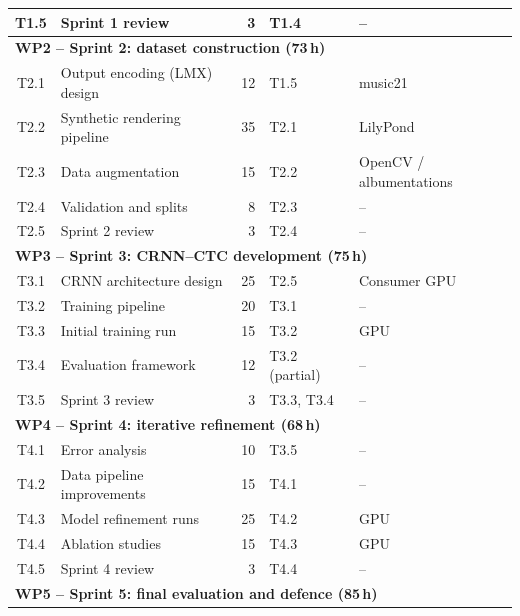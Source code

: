 \begin{table}[H]
\begin{tabularx}{\linewidth}{c >{\raggedright}p{4.2cm} r >{\raggedright\arraybackslash}p{2.2cm} >{\raggedright\arraybackslash}p{2.0cm}}
        T1.5 & Sprint 1 review                      & 3   & T1.4           & -- \\
        \midrule
        \multicolumn{5}{l}{\textbf{WP2 -- Sprint 2: dataset construction (73\,h)}} \\
        \midrule
        T2.1 & Output encoding (LMX) design         & 12  & T1.5           & music21 \\
        T2.2 & Synthetic rendering pipeline         & 35  & T2.1           & LilyPond \\
        T2.3 & Data augmentation                    & 15  & T2.2           & OpenCV / albumentations \\
        T2.4 & Validation and splits                & 8   & T2.3           & -- \\
        T2.5 & Sprint 2 review                      & 3   & T2.4           & -- \\
        \midrule
        \multicolumn{5}{l}{\textbf{WP3 -- Sprint 3: CRNN--CTC development (75\,h)}} \\
        \midrule
        T3.1 & CRNN architecture design             & 25  & T2.5           & Consumer GPU \\
        T3.2 & Training pipeline                    & 20  & T3.1           & -- \\
        T3.3 & Initial training run                 & 15  & T3.2           & GPU \\
        T3.4 & Evaluation framework                 & 12  & T3.2 (partial) & -- \\
        T3.5 & Sprint 3 review                      & 3   & T3.3, T3.4     & -- \\
        \midrule
        \multicolumn{5}{l}{\textbf{WP4 -- Sprint 4: iterative refinement (68\,h)}} \\
        \midrule
        T4.1 & Error analysis                       & 10  & T3.5           & -- \\
        T4.2 & Data pipeline improvements           & 15  & T4.1           & -- \\
        T4.3 & Model refinement runs                & 25  & T4.2           & GPU \\
        T4.4 & Ablation studies                     & 15  & T4.3           & GPU \\
        T4.5 & Sprint 4 review                      & 3   & T4.4           & -- \\
        \midrule
        \multicolumn{5}{l}{\textbf{WP5 -- Sprint 5: final evaluation and defence (85\,h)}} \\

\end{tabularx}
\end{table}
